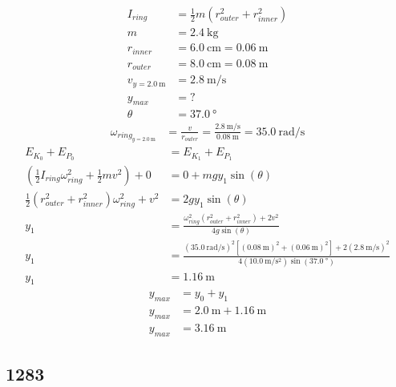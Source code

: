 \documentclass{article}
\begin{document}
\begin{align*}
	I_{ring} & = \frac{1}{2}m(r_{outer}^2 + r_{inner}^2) \\
	m & = \SI{2.4}{\kilogram} \\
	r_{inner} & = \SI{6.0}{\centi \meter} = \SI{0.06}{\meter} \\
	r_{outer} & = \SI{8.0}{\centi \meter} = \SI{0.08}{\meter} \\
	v_{y = \SI{2.0}{\meter}} & = \SI{2.8}{\meter \per \second} \\
	y_{max} & = ? \\
	\theta & = \SI{37.0}{\degree}
\end{align*}
\begin{align*}
	\omega_{ring_{y = \SI{2.0}{\meter}}} & = \frac{v}{r_{outer}} = \frac{\SI{2.8}{\meter \per \second}}{\SI{0.08}{\meter}} = \SI{35.0}{\radian \per \second}
\end{align*}
\begin{align*}
	E_{K_0} + E_{P_0} & = E_{K_1} + E_{P_1} \\
	\left( \frac{1}{2}I_{ring}\omega_{ring}^2 + \frac{1}{2}mv^2 \right) + 0 & = 0 + mgy_1\sin(\theta) \\
	\frac{1}{2}(r_{outer}^2 + r_{inner}^2)\omega_{ring}^2 + v^2 & = 2gy_1\sin(\theta) \\
	y_1 & = \frac{ \omega_{ring}^2(r_{outer}^2 + r_{inner}^2) + 2v^2 }{ 4g\sin(\theta) } \\
	y_1 & = \frac{ (\SI{35.0}{\radian \per \second})^2 \left[ (\SI{0.08}{\meter})^2 + (\SI{0.06}{\meter})^2 \right] + 2(\SI{2.8}{\meter \per \second})^2 }{ 4(\SI{10.0}{\meter \per \second \squared})\sin(\SI{37.0}{\degree}) } \\
	y_1 & = \SI{1.16}{\meter}
\end{align*}
\begin{align*}
	y_{max} & = y_0 + y_1 \\
	y_{max} & = \SI{2.0}{\meter} + \SI{1.16}{\meter} \\
	y_{max} & = \SI{3.16}{\meter}
\end{align*}

\subsection{1283}
\end{document}
